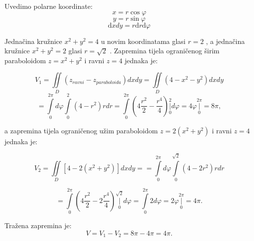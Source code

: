 \documentclass[a4paper,11pt]{article}
\begin{document}
Uvedimo polarne koordinate:
$$x = r \cos{\varphi}$$
$$y = r \sin{\varphi}$$
 $$\mathrm dxdy = r  \mathrm d r  \mathrm d\varphi$$
\begin{center}
\end{center}
 Jednačina kružnice $ x^2+y^2=4$ u novim koordinatama glasi $ r=2$ , a jednačina kružnice $ x^2+y^2=2$ glasi $ r=\sqrt 2$ .
Zapremina  tijela ograničenog širim paraboloidom $ z=x^2+y^2$ i ravni $ z=4$ jednaka je:

$$ V_{1} 	 =\iint\limits_{ D }\left( z_{ravni}- z_{paraboloida}\right) dx dy=\iint\limits_{D}\left( 4-x^{2}-y^{2}\right) dx dy$$ 	   
  	$$ =\int\limits_{0}^{2\pi } d\varphi \int\limits_{0}^{2}( 4-r^{2})r dr =\int\limits_{0}^{2\pi }\left(4\frac{r^{2}  }{2} - \frac{r^{4}  }{4} \right) \underset{0}{\overset{2 }{ \bigg\vert}}d\varphi =4\varphi \underset{0}{\overset{2\pi }{ \bigg\vert}}=8\pi,$$ 	   
  	 	   

a zapremina tijela ograničenog užim paraboloidom $ z=2(x^2+y^2)$ i ravni $ z=4$ jednaka je:

$$ V_{2} =\iint\limits_{D}\left[ 4-2\left( x^{2}+y^{2}\right) \right] dx dy =  =\int\limits_{0}^{2\pi } d\varphi \int\limits_{0}^{\sqrt{2}}(4 - 2r^{2})r dr$$ 	   
  
  
  	$$=\int\limits_{0}^{2\pi }\left(4\frac{r^{2}  }{2} - 2\frac{r^{4}  }{4} \right) \underset{0}{\overset{\sqrt{2} }{ \bigg\vert}}d\varphi = \int\limits_{0}^{2\pi } 2 d\varphi = 2\varphi \underset{0}{\overset{2\pi }{ \bigg\vert}} = 4\pi.  $$ 	   

Tražena zapremina je: $$ V=V_{1}-V_{2}=8\pi -4\pi =4\pi.$$
\end{document}
